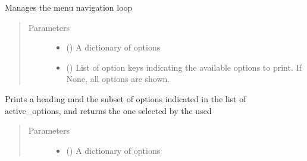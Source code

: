 \documentclass[letterpaper,10pt,english]{sphinxmanual}
\begin{document}
\begin{fulllineitems}
\begin{fulllineitems}
\end{fulllineitems}


\begin{fulllineitems}
\label{\detokenize{mn_menu_navigator:src.menu_navigator.menu_navigator.MenuNavigator.navigate}}
\sphinxAtStartPar
Manages the menu navigation loop
\begin{quote}\begin{description}
\item[{Parameters}] \leavevmode\begin{itemize}
\item {} 
\sphinxAtStartPar
{} () \textendash{} A dictionary of options

\item {} 
\sphinxAtStartPar
{} () \textendash{} List of option keys indicating the available options to print.
If None, all options are shown.

\end{itemize}

\end{description}\end{quote}

\end{fulllineitems}


\begin{fulllineitems}
\label{\detokenize{mn_menu_navigator:src.menu_navigator.menu_navigator.MenuNavigator.query_options}}
\sphinxAtStartPar
Prints a heading mnd the subset of options indicated in the list of
active\_options, and returns the one selected by the used
\begin{quote}\begin{description}
\item[{Parameters}] \leavevmode\begin{itemize}
\item {} 
\sphinxAtStartPar
{} () \textendash{} A dictionary of options


\end{itemize}
\end{description}
\end{quote}
\end{fulllineitems}
\end{fulllineitems}
\end{document}
